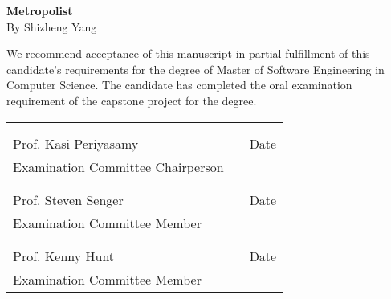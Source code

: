 \thispagestyle{empty}
\vspace*{0.3in}
\begin{center}
	\large{\textbf{Metropolist}} \\
	\vspace{0.75in}
	\normalsize{By Shizheng Yang}
\end{center}

\vspace{0.5in}
\noindent We recommend acceptance of this manuscript in partial fulfillment of this candidate's requirements for the degree of Master of Software Engineering in Computer Science. The candidate has completed the oral examination requirement of the capstone project for the degree. \\

\noindent
\begin{tabularx}{\textwidth}{p{3in}Xp{2in}}
	\rule{0pt}{50pt} & & \\
	\hrulefill & & \hrulefill \\
	Prof. Kasi Periyasamy & & Date \\
	Examination Committee Chairperson & & \\
	\rule{0pt}{50pt} & & \\
	\hrulefill & & \hrulefill \\
	Prof. Steven Senger & & Date \\
	Examination Committee Member & & \\
	\rule{0pt}{50pt} & & \\
	\hrulefill & & \hrulefill \\
	Prof. Kenny Hunt & & Date \\
	Examination Committee Member & & \\
\end{tabularx}

